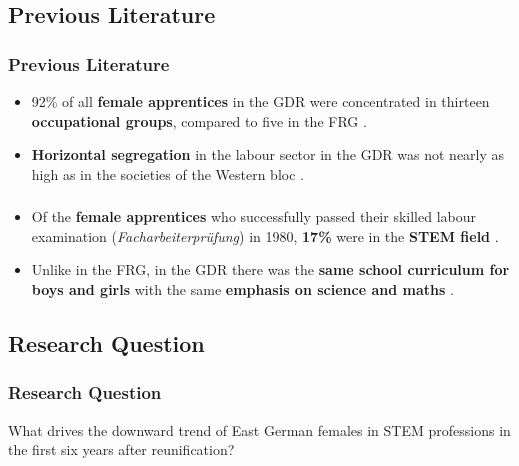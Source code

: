 \documentclass[11pt, aspectratio=1610, xcolor={dvipsnames}]{beamer}
\newcommand{\highlight}[1]{\textbf{\textcolor{PineGreen}{#1}}}
\begin{document}
	\subsection{Previous Literature}
	\begin{frame}
		\frametitle{Previous Literature}
		
		\begin{itemize}
			\item 92\% of all \highlight{female apprentices} in the GDR were concentrated in thirteen \highlight{occupational groups}, compared to five in the FRG \textcolor{darkgray}{\citep{Menschik1974}}.
			\item \highlight{Horizontal segregation} in the labour sector in the GDR was not nearly as high as in the societies of the Western bloc \textcolor{darkgray}{\citep{Lane1983}}.
		\end{itemize}
		
	\end{frame}
	
		\begin{frame}
		\frametitle{}
		
		\begin{itemize}
			\item Of the \highlight{female apprentices} who successfully passed their skilled labour examination (\emph{Facharbeiterprüfung}) in 1980, \highlight{17\%} were in the \highlight{STEM field} \textcolor{darkgray}{\citep[p. 293]{DDRJahrbuch1981}}.
			\item Unlike in the FRG, in the GDR there was the \highlight{same school curriculum for boys and girls} with the same \highlight{emphasis on science and maths} \textcolor{darkgray}{\citep{FuchsSchuendeln2016, Lippmann2018}}. 
		\end{itemize}
		
	\end{frame}
	
	
	\subsection{Research Question}
	\begin{frame}
		\frametitle{Research Question}
		
		What drives the downward trend of East German females in STEM professions in the first six years after reunification?
		
	\end{frame}
	
\end{document}
